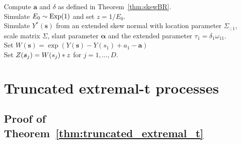 \documentclass[12pt]{article}
\begin{document}
\begin{algorithm}
\caption{Exact simulation from the skewed Brown-Resnick process at location $\bs_i,i=1,\dots,D$.}
\label{algo:log_skew_normal}
Compute $\bm a$ and $\delta$ as defined in Theorem~\ref{thm:skewBR}.\\
Simulate $E_0 \sim \rm{Exp}(1)$ and set $z=1/E_0$.\\ 
Simulate $Y^*(\bm s)$ from an extended skew normal with location parameter $\Sigma_{\cdot;1}$, scale matrix $\Sigma$, slant parameter $\bm \alpha$ and the extended parameter $\tau_1=\delta_1 \omega_{11}$.\\
Set $W(\bm s) = \exp(Y(\bm s)-Y(s_1)+a_1 - \bm a)$ \\
Set $Z({\boldsymbol{s}}_j)=W(s_j)*z$ for $j=1,\dots,D$. \\
\end{algorithm}



\section{Truncated extremal-t processes}
\label{sec:appendix_truncated_extremal_t}

\subsection{Proof of Theorem~\ref{thm:truncated_extremal_t}}
\end{document}
